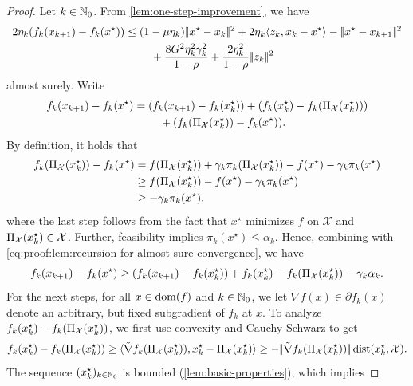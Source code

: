 \begin{proof}
    Let $k\in\mathbb{N}_0$. From \cref{lem:one-step-improvement}, we have
    \begin{align*}
        2\eta_k(f_k(x_{k+1}) - f_k(x^\star))
        &\leq ( 1 - \mu\eta_k ) |\!|x^\star - x_k|\!|^2 + 2\eta_k\langle z_k, x_k - x^\star \rangle 
            - |\!|x^\star - x_{k+1}|\!|^2 \\
        &\phantom{===} +  \frac{8 G^2\eta_k^2\gamma_k^2}{1 - \rho} + \frac{2\eta_k^2}{1 - \rho}|\!|z_k|\!|^2
    \end{align*}
    almost surely.
    Write
    \begin{align}
        \label{eq:proof:lem:recursion-for-almost-sure-convergence}
        f_k(x_{k+1}) - f_k(x^\star)
        &=
       (f_k(x_{k+1}) - f_k(x_k^\star)) + (f_k(x_k^\star) - f_k(\operatorname{\Pi_\mathcal{X}}(x_k^\star))) \\
        &\phantom{===}+ (f_k(\operatorname{\Pi_\mathcal{X}}(x_k^\star)) - f_k(x^\star)). \notag
    \end{align}
    By definition, it holds that
    \begin{align*}
        f_k(\operatorname{\Pi_\mathcal{X}}(x_k^\star)) - f_k(x^\star)
        &=
        f(\operatorname{\Pi_\mathcal{X}}(x_k^\star)) + \gamma_k \pi_k(\operatorname{\Pi_\mathcal{X}}(x_k^\star)) - f(x^\star) - \gamma_k \pi_k(x^\star) \\
        &\geq
        f(\operatorname{\Pi_\mathcal{X}}(x_k^\star)) - f(x^\star) - \gamma_k \pi_k(x^\star) \\
        &\geq
        - \gamma_k \pi_k(x^\star),
    \end{align*}
    where the last step follows from the fact that $x^\star$ minimizes $f$ on $\mathcal{X}$
    and $\operatorname{\Pi_\mathcal{X}}(x_k^\star)\in\mathcal{X}$. Further, feasibility implies $\pi_k(x^\star) \leq \alpha_k$.
    Hence, combining with \eqref{eq:proof:lem:recursion-for-almost-sure-convergence}, we have
    \[
        f_k(x_{k+1}) - f_k(x^\star) \geq (f_k(x_{k+1}) - f_k(x_k^\star)) + f_k(x_k^\star) - f_k(\operatorname{\Pi_\mathcal{X}}(x_k^\star)) - \gamma_k\alpha_k.
    \]
    For the next steps, for all $x\in\operatorname{dom}(f)$ and $k\in\mathbb{N}_0$,
    we let $\tilde{\nabla} f(x) \in \partial f_k(x)$ denote an arbitrary,
    but fixed subgradient of $f_k$ at $x$.
    To analyze $f_k(x_k^\star) - f_k(\operatorname{\Pi_\mathcal{X}}(x_k^\star))$, we first use convexity and Cauchy-Schwarz to get
    \[
        f_k(x_k^\star) - f_k(\operatorname{\Pi_\mathcal{X}}(x_k^\star))
        \geq \langle \tilde{\nabla} f_k(\operatorname{\Pi_\mathcal{X}}(x_k^\star)), x_k^\star - \operatorname{\Pi_\mathcal{X}}(x_k^\star) \rangle
        \geq -|\!|\tilde{\nabla} f_k(\operatorname{\Pi_\mathcal{X}}(x_k^\star))|\!| \operatorname{dist}(x_k^\star, \mathcal{X}).
    \]
    The sequence $(x_k^\star)_{k\in\mathbb{N}_0}$ is bounded (\cref{lem:basic-properties}), which implies

\end{proof}
